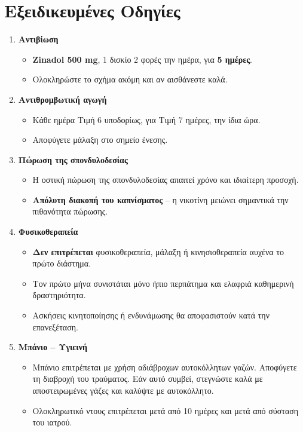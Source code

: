\documentclass[10pt,greek]{article}
\begin{document}
\section*{Εξειδικευμένες Οδηγίες}
\begin{enumerate}[label=\arabic*.]
  \item \textbf{Αντιβίωση}
      \begin{itemize}
\item \textbf{Zinadol 500 mg}, 1 δισκίο 2 φορές την ημέρα, για \textbf{5 ημέρες}.
\item Ολοκληρώστε το σχήμα ακόμη και αν αισθάνεστε καλά.
    \end{itemize}
  \item \textbf{Αντιθρομβωτική αγωγή}
      \begin{itemize}
\item Κάθε ημέρα Τιμή 6 υποδορίως, για Τιμή 7 ημέρες, την ίδια ώρα.
\item Αποφύγετε μάλαξη στο σημείο ένεσης.
    \end{itemize}
  \item \textbf{Πώρωση της σπονδυλοδεσίας}
      \begin{itemize}
\item Η οστική πώρωση της σπονδυλοδεσίας απαιτεί χρόνο και ιδιαίτερη προσοχή.
\item \textbf{Απόλυτη διακοπή του καπνίσματος} -- η νικοτίνη μειώνει σημαντικά την πιθανότητα πώρωσης.
    \end{itemize}
  \item \textbf{Φυσικοθεραπεία}
      \begin{itemize}
\item \textbf{Δεν επιτρέπεται} φυσικοθεραπεία, μάλαξη ή κινησιοθεραπεία αυχένα το πρώτο διάστημα.
\item Τον πρώτο μήνα συνιστάται μόνο ήπιο περπάτημα και ελαφριά καθημερινή δραστηριότητα.
\item Ασκήσεις κινητοποίησης ή ενδυνάμωσης θα αποφασιστούν κατά την επανεξέταση.
    \end{itemize}
    \item \textbf{Μπάνιο -- Υγιεινή}
        \begin{itemize}
\item Μπάνιο επιτρέπεται με χρήση αδιάβροχων αυτοκόλλητων γαζών. Αποφύγετε τη διαβροχή του τραύματος. Εάν αυτό συμβεί, στεγνώστε καλά με αποστειρωμένες γάζες και καλύψτε με αυτοκόλλητο.
\item Ολοκληρωτικό ντους επιτρέπεται μετά από 10 ημέρες και μετά από σύσταση του ιατρού.
        \end{itemize}
\end{enumerate}
\end{document}
